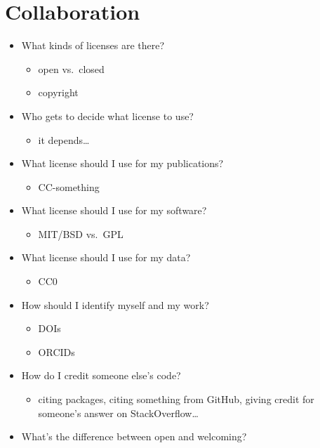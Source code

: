 \documentclass[]{Nemilov}
\providecommand{\tightlist}{%
  \setlength{\itemsep}{0pt}\setlength{\parskip}{0pt}}
\begin{document}
\hypertarget{collaboration}{%
\section{Collaboration}\label{collaboration}}

\begin{itemize}
\tightlist
\item
  What kinds of licenses are there?

  \begin{itemize}
  \tightlist
  \item
    open vs.~closed
  \item
    copyright
  \end{itemize}
\item
  Who gets to decide what license to use?

  \begin{itemize}
  \tightlist
  \item
    it depends\ldots{}
  \end{itemize}
\item
  What license should I use for my publications?

  \begin{itemize}
  \tightlist
  \item
    CC-something
  \end{itemize}
\item
  What license should I use for my software?

  \begin{itemize}
  \tightlist
  \item
    MIT/BSD vs.~GPL
  \end{itemize}
\item
  What license should I use for my data?

  \begin{itemize}
  \tightlist
  \item
    CC0
  \end{itemize}
\item
  How should I identify myself and my work?

  \begin{itemize}
  \tightlist
  \item
    DOIs
  \item
    ORCIDs
  \end{itemize}
\item
  How do I credit someone else's code?

  \begin{itemize}
  \tightlist
  \item
    citing packages, citing something from GitHub, giving credit for someone's answer on StackOverflow\ldots{}
  \end{itemize}
\item
  What's the difference between open and welcoming?


\end{itemize}
\end{document}

